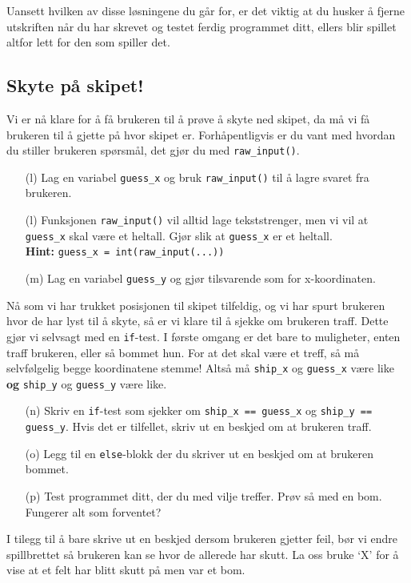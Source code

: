 \documentclass[a4paper, 11pt, notitlepage]{article}
\begin{document}
Uansett hvilken av disse løsningene du går for, er det viktig at du husker å fjerne utskriften når du har skrevet og testet ferdig programmet ditt, ellers blir spillet altfor lett for den som spiller det.

\subsection*{Skyte på skipet!}

Vi er nå klare for å få brukeren til å prøve å skyte ned skipet, da må vi få brukeren til å gjette på hvor skipet er. Forhåpentligvis er du vant med hvordan du stiller brukeren spørsmål, det gjør du med \verb+raw_input()+.
\begin{itemize}
	\item[(l)] Lag en variabel \verb+guess_x+ og bruk \verb+raw_input()+ til å lagre svaret fra brukeren.
	\item[(l)] Funksjonen \verb+raw_input()+ vil alltid lage tekststrenger, men vi vil at \verb+guess_x+ skal være et heltall. Gjør slik at \verb+guess_x+ er et heltall. \\ 
			   \textbf{Hint: } \verb+guess_x = int(raw_input(...))+
	\item[(m)] Lag en variabel \verb+guess_y+ og gjør tilsvarende som for x-koordinaten.
\end{itemize}

\clearpage

Nå som vi har trukket posisjonen til skipet tilfeldig, og vi har spurt brukeren hvor de har lyst til å skyte, så er vi klare til å sjekke om brukeren traff. Dette gjør vi selvsagt med en \verb+if+-test. I første omgang er det bare to muligheter, enten traff brukeren, eller så bommet hun. For at det skal være et treff, så må selvfølgelig begge koordinatene stemme! Altså må \verb+ship_x+ og \verb+guess_x+ være like \textbf{og} \verb+ship_y+ og \verb+guess_y+ være like.
\begin{itemize}
	\item[(n)] Skriv en \verb+if+-test som sjekker om \verb+ship_x == guess_x+ og \verb+ship_y == guess_y+. Hvis det er tilfellet, skriv ut en beskjed om at brukeren traff. 
	\item[(o)] Legg til en \verb+else+-blokk der du skriver ut en beskjed om at brukeren bommet.
	\item[(p)] Test programmet ditt, der du med vilje treffer. Prøv så med en bom. Fungerer alt som forventet?
\end{itemize}

I tilegg til å bare skrive ut en beskjed dersom brukeren gjetter feil, bør vi endre spillbrettet så brukeren kan se hvor de allerede har skutt. La oss bruke `X' for å vise at et felt har blitt skutt på men var et bom.
\end{document}
